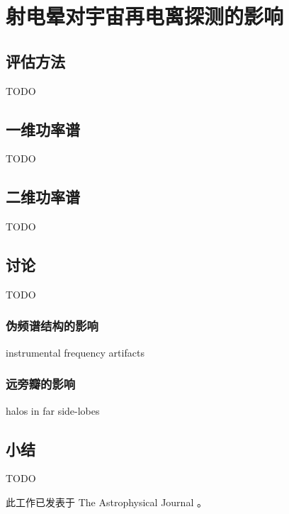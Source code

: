 \chapter{射电晕对宇宙再电离探测的影响}
\label{chap:halo}

\section{评估方法}

TODO


\section{一维功率谱}

TODO


\section{二维功率谱}

TODO


\section{讨论}

TODO

\subsection{伪频谱结构的影响}

instrumental frequency artifacts

\subsection{远旁瓣的影响}

halos in far side-lobes


\section{小结}

TODO

此工作已发表于 The Astrophysical Journal \cite{li2018halo}。


